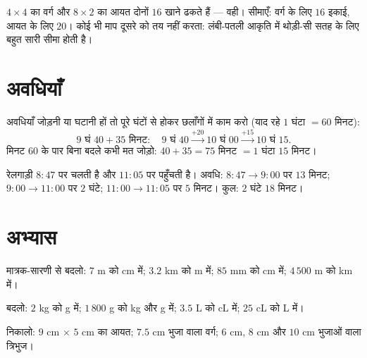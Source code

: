 \begin{example}\label{ex:g4:measure:samearea}
$4 \times 4$ का वर्ग और $8 \times 2$ का आयत दोनों $16$ खाने
ढकते हैं ---  वही। सीमाएँ: वर्ग के लिए $16$ इकाई, आयत
के लिए $20$। कोई भी माप दूसरे को तय नहीं करता: लंबी-पतली आकृति
में थोड़ी-सी सतह के लिए बहुत सारी सीमा होती है।
\end{example}

\section{अवधियाँ}

\begin{method}[घंटे के पार समय जोड़ना]\label{met:g4:measure:time}
अवधियाँ जोड़नी या घटानी हों तो पूरे घंटों से होकर छलाँगों में
काम करो (याद रहे $1$ घंटा $= 60$ मिनट):
\[
9\text{ घं }40 + 35 \text{ मिनट}:
\quad 9\text{ घं }40 \xrightarrow{+20} 10\text{ घं }00
\xrightarrow{+15} 10\text{ घं }15 .
\]
मिनट $60$ के पार बिना बदले कभी मत जोड़ो: $40 + 35 = 75$ मिनट
$= 1$ घंटा $15$ मिनट।
\end{method}

\begin{example}\label{ex:g4:measure:timetable}
रेलगाड़ी $8{:}47$ पर चलती है और $11{:}05$ पर पहुँचती है। अवधि:
$8{:}47 \to 9{:}00$ पर $13$ मिनट; $9{:}00 \to 11{:}00$ पर
$2$ घंटे; $11{:}00 \to 11{:}05$ पर $5$ मिनट। कुल: $2$ घंटे $18$ मिनट।
\end{example}

\section{अभ्यास}

\begin{exercise}[$\star$]\label{exo:g4:measure:1}
मात्रक-सारणी से बदलो: $7$ m को cm में; $3.2$ km को m में;
$85$ mm को cm में; $4\,500$ m को km में।
\end{exercise}

\begin{exercise}[$\star$]\label{exo:g4:measure:2}
बदलो: $2$ kg को g में; $1\,800$ g को kg और g में; $3.5$ L को
cL में; $25$ cL को L में।
\end{exercise}

\begin{exercise}[$\star$]\label{exo:g4:measure:3}
 निकालो: $9$ cm $\times$ $5$ cm का आयत; $7.5$ cm भुजा
वाला वर्ग; $6$ cm, $8$ cm और $10$ cm भुजाओं वाला त्रिभुज।
\end{exercise}

